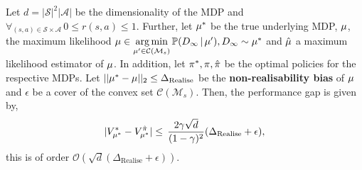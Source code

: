 \begin{theorem}\label{lemma:non-realisable}
Let $d = |\mathcal{S}|^2|\mathcal{A}|$ be the dimensionality of the MDP and $\forall_{(s, a) \in \mathcal{S}\times \mathcal{A}} \, 0 \leq r(s, a) \leq 1$. Further, let $\mu^{*}$ be the true underlying MDP, $\mu$, the maximum likelihood $\mu \in \underset{\mu' \in \mathcal{C}(\mathcal{M}_s)}{\arg\min} \, \mathbb{P}(D_\infty \, | \, \mu'), D_\infty \sim \mu^{*}$ and $\hat{\mu}$ a maximum likelihood estimator of $\mu$. In addition, let $\pi^{*}, \pi, \hat{\pi}$ be the optimal policies for the respective MDPs. Let $||\mu^{*}-\mu||_2 \leq \Delta_{\mathrm{Realise}}$ be the \textbf{non-realisability bias} of $\mu$ and $\epsilon$ be a cover of the convex set $\mathcal{C}(\mathcal{M}_s)$. Then, the performance gap is given by,
    \begin{equation}
        |V_{{\mu^*}}^{*}-V_{{\mu^*}}^{\hat{\pi}}| \leq \, \frac{2\gamma\sqrt{d}}{(1-\gamma)^2} (\Delta_{\mathrm{Realise}}+\epsilon),
    \end{equation}
this is of order $\mathcal{O}(\sqrt{d}(\Delta_{\mathrm{Realise}}+\epsilon))$.
\end{theorem}
